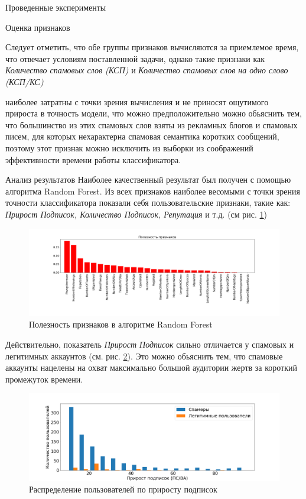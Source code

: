 \begin{section}{Проведенные эксперименты}
\begin{subsection}{Оценка признаков}
\begin{table}[H]
\caption{Время вычисления признаков}
\label{tab:comptime}
\end{table}

Следует отметить, что обе группы признаков вычисляются за приемлемое время, что отвечает условиям поставленной задачи, однако такие признаки как \textit{Количество спамовых слов (КСП)} и \textit{Количество спамовых слов на одно слово (КСП/КС)}
\end{subsection} наиболее затратны с точки зрения вычисления и не приносят ощутимого прироста в точность модели, что можно предположительно можно обьяснить тем, что большинство из этих спамовых слов взяты из рекламных блогов и спамовых писем, для которых нехарактерна спамовая семантика коротких сообщений, поэтому этот признак можно исключить из выборки из соображений эффективности времени работы классификатора.


\begin{subsection}{Анализ результатов}
Наиболее качественный результат был получен с помощью алгоритма Random Forest. Из всех признаков наиболее весомыми с точки зрения точности классификатора показали себя пользовательские признаки, такие как: \textit{Прирост Подписок, Количество Подписок, Репутация} и т.д. (см рис. \ref{pic:feature_importance})

\begin{figure}[ht!]
\centering
\includegraphics[width=1.0\textwidth]{pics/featureImportance.png}
\caption{Полезность признаков в алгоритме Random Forest}
\label{pic:feature_importance}
\end{figure}

Действительно, показатель \textit{Прирост Подписок} сильно отличается у спамовых и легитимных аккаунтов (см. рис. \ref{pic:flwngsincrease}). Это можно обьяснить тем, что спамовые аккаунты нацелены на охват максимально большой аудитории жертв за короткий промежуток времени.


\begin{figure}[ht!]
\centering
\includegraphics[width=1.0\textwidth]{pics/flwngsincrease.png}
\caption{Распределение пользователей по приросту подписок}
\label{pic:flwngsincrease}
\end{figure}


\end{subsection}
\end{section}
